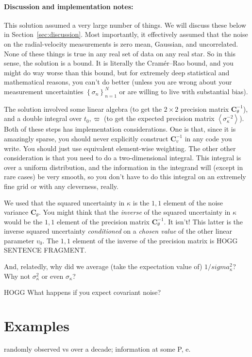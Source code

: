 \documentclass[10pt, letterpaper]{article}
\newcommand{\sectionname}{Section}
\newcommand{\inv}{^{-1}}
\newcommand{\setof}[1]{\left\{{#1}\right\}}
\newcommand{\mean}[1]{\left<{#1}\right>}
\newcommand{\tensor}[1]{\mathbf{#1}}
\newcommand{\tC}{\tensor{C}}
\newcounter{marginnote}
\renewcommand{\footnote}[1]{\refstepcounter{marginnote}\textsuperscript{\themarginnote}\marginpar{\color{darkgray}\raggedright\footnotesize\textsuperscript{\themarginnote}#1}}
\begin{document}
\paragraph{Discussion and implementation notes:}
This solution assumed a very large number of things. We will discuss these
below in \sectionname~\ref{sec:discussion}. Most importantly, it effectively
assumed that the noise on the radial-velocity measurements is zero mean,
Gaussian, and uncorrelated. None of these things is true in any real
set of data on any real star. So in this sense, the solution is a bound.
It is literally the Cram\'er--Rao bound\footnote{HOGG CITE}, and you might
do way worse than this bound, but for extremely deep statistical and
mathematical reasons, you can't do better (unless you are wrong about your
measurement uncertainties $\setof{\sigma_n}_{n=1}^N$ or are willing to live
with substantial bias).

The solution involved some linear algebra (to get the $2\times 2$
precision matrix $\tC_\theta\inv$), and a double integral over $t_0,
\varpi$ (to get the expected precision matrix
$\mean{\sigma^{-2}_\kappa}$). Both of these steps has
implementation considerations. One is that, since it
is amazingly sparse, you should never explicitly construct $\tC_v\inv$
in any code you write. You should just use equivalent element-wise
weighting.
The other other consideration is that you need to do a two-dimensional
integral. This integral is over a uniform distribution, and the information
in the integrand will (except in rare cases) be very smooth, so you don't
have to do this integral on an extremely fine grid or with any cleverness,
really.

We used that the squared uncertainty in $\kappa$ is the $1,1$ element of the
noise variance $\tC_\theta$.
You might think that the \emph{inverse} of the squared uncertainty in $\kappa$ would be
the $1,1$ element of the precision matrix $\tC_\theta\inv$.
It isn't!
This latter is the inverse squared uncertainty \emph{conditioned} on
a \emph{chosen value} of the other linear parameter $v_0$.
The $1,1$ element of the inverse of the precision matrix is HOGG SENTENCE FRAGMENT.

And, relatedly, why did we average (take the expectation value of)
$1/sigma^2_\kappa$? Why not $\sigma^2_\kappa$ or even $\sigma_\kappa$?

HOGG What happens if you expect covariant noise?

\section{Examples}
randomly observed vs over a decade; information at some P, e.
\end{document}
